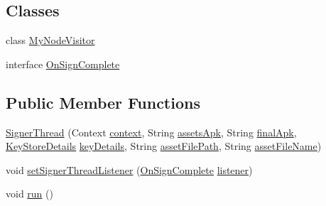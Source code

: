 \subsection*{Classes}
\begin{DoxyCompactItemize}
\item 
class \hyperlink{classorg_1_1buildmlearn_1_1toolkit_1_1utilities_1_1SignerThread_1_1MyNodeVisitor}{My\+Node\+Visitor}
\item 
interface \hyperlink{interfaceorg_1_1buildmlearn_1_1toolkit_1_1utilities_1_1SignerThread_1_1OnSignComplete}{On\+Sign\+Complete}
\end{DoxyCompactItemize}
\subsection*{Public Member Functions}
\begin{DoxyCompactItemize}
\item 
\hyperlink{classorg_1_1buildmlearn_1_1toolkit_1_1utilities_1_1SignerThread_a5a37aaaeb632085cc262eb0376f4cabb}{Signer\+Thread} (Context \hyperlink{classorg_1_1buildmlearn_1_1toolkit_1_1utilities_1_1SignerThread_a666153665b183a4cafa7d60fa30b977e}{context}, String \hyperlink{classorg_1_1buildmlearn_1_1toolkit_1_1utilities_1_1SignerThread_a51d7e3c05429574239160c6c7ffd11f5}{assets\+Apk}, String \hyperlink{classorg_1_1buildmlearn_1_1toolkit_1_1utilities_1_1SignerThread_a8b2b26a220753cfc192487bb0d47a72d}{final\+Apk}, \hyperlink{classorg_1_1buildmlearn_1_1toolkit_1_1model_1_1KeyStoreDetails}{Key\+Store\+Details} \hyperlink{classorg_1_1buildmlearn_1_1toolkit_1_1utilities_1_1SignerThread_a787591c33749051d9ae71911b0d1d426}{key\+Details}, String \hyperlink{classorg_1_1buildmlearn_1_1toolkit_1_1utilities_1_1SignerThread_add70395b01fcaf42a1d4af32f6d16d7a}{asset\+File\+Path}, String \hyperlink{classorg_1_1buildmlearn_1_1toolkit_1_1utilities_1_1SignerThread_a62b2df0dcab626f9189812034f3f1510}{asset\+File\+Name})
\item 
void \hyperlink{classorg_1_1buildmlearn_1_1toolkit_1_1utilities_1_1SignerThread_a2f75999b55a36de5421b6563677eb75a}{set\+Signer\+Thread\+Listener} (\hyperlink{interfaceorg_1_1buildmlearn_1_1toolkit_1_1utilities_1_1SignerThread_1_1OnSignComplete}{On\+Sign\+Complete} \hyperlink{classorg_1_1buildmlearn_1_1toolkit_1_1utilities_1_1SignerThread_a6acac9c3507d6bc9e720aea1486f9beb}{listener})
\item 
void \hyperlink{classorg_1_1buildmlearn_1_1toolkit_1_1utilities_1_1SignerThread_ab03f540249e80693f090c9b30c692d17}{run} ()
\end{DoxyCompactItemize}
